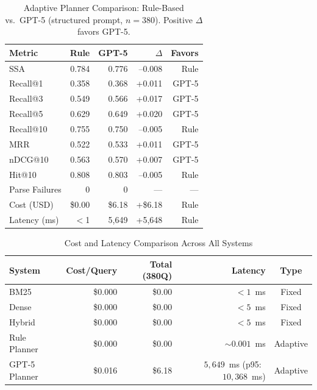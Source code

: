 
\begin{table}[ht]
\centering
\caption{Adaptive Planner Comparison: Rule-Based vs.\ GPT-5 (structured prompt, $n{=}380$). Positive $\Delta$ favors GPT-5.}
\label{tab:planner_comparison}
\begin{tabular}{lrrrr}
\toprule
\textbf{Metric} & \textbf{Rule} & \textbf{GPT-5} & $\Delta$ & \textbf{Favors} \\
\midrule
SSA             & 0.784 & 0.776 & --0.008 & Rule \\
Recall@1        & 0.358 & 0.368 & +0.011  & GPT-5 \\
Recall@3        & 0.549 & 0.566 & +0.017  & GPT-5 \\
Recall@5        & 0.629 & 0.649 & +0.020  & GPT-5 \\
Recall@10       & 0.755 & 0.750 & --0.005 & Rule \\
MRR             & 0.522 & 0.533 & +0.011  & GPT-5 \\
nDCG@10         & 0.563 & 0.570 & +0.007  & GPT-5 \\
Hit@10          & 0.808 & 0.803 & --0.005 & Rule \\
\midrule
Parse Failures  & 0     & 0     & ---     & --- \\
Cost (USD)      & \$0.00 & \$6.18 & +\$6.18 & Rule \\
Latency (ms)    & $<$1   & 5{,}649 & +5{,}648 & Rule \\
\bottomrule
\end{tabular}
\end{table}



\begin{table}[ht]
\centering
\caption{Cost and Latency Comparison Across All Systems}
\label{tab:cost_latency}
\begin{tabular}{lrrrc}
\toprule
\textbf{System} & \textbf{Cost/Query} & \textbf{Total (380Q)} & \textbf{Latency} & \textbf{Type} \\
\midrule
BM25            & \$0.000 & \$0.00 & ${<}1$~ms  & Fixed \\
Dense           & \$0.000 & \$0.00 & ${<}5$~ms  & Fixed \\
Hybrid          & \$0.000 & \$0.00 & ${<}5$~ms  & Fixed \\
Rule Planner    & \$0.000 & \$0.00 & ${\sim}0.001$~ms & Adaptive \\
GPT-5 Planner   & \$0.016 & \$6.18 & $5{,}649$~ms (p95:~$10{,}368$~ms) & Adaptive \\
\bottomrule
\end{tabular}
\end{table}
